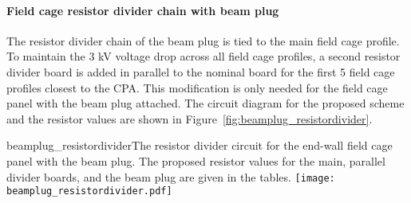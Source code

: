 \paragraph{Field cage resistor divider chain with beam plug}
The resistor divider chain of the beam plug is tied to the main field cage profile. To maintain the 3 kV voltage drop across all field cage profiles, a second resistor divider board is added in parallel to the nominal board for the first 5 field cage profiles closest to the CPA. This modification is only needed for the field cage panel with the beam plug attached. The circuit diagram for the proposed scheme and the resistor values are shown in Figure~\ref{fig:beamplug_resistordivider}.
\begin{cdrfigure}{beamplug_resistordivider}{The resistor divider circuit for the end-wall field cage panel with the beam plug. The proposed resistor values for the main, parallel divider boards, and the beam plug are given in the tables.}
  \texttt{[image: beamplug\_resistordivider.pdf]}
\end{cdrfigure}
